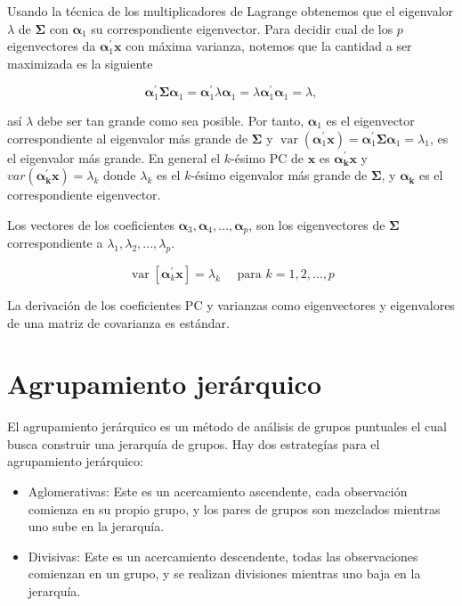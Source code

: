 Usando la técnica de los multiplicadores de Lagrange obtenemos que el eigenvalor $\lambda$ de $\boldsymbol{\Sigma}$ con $\boldsymbol{\alpha}_{1}$ su correspondiente eigenvector. Para decidir cual de los $p$ eigenvectores da $\boldsymbol{\alpha}_{1}^{\prime}\boldsymbol{x}$ con máxima varianza, notemos que la cantidad a ser maximizada es la siguiente

\[
\boldsymbol{\alpha}_{1}^{\prime} \boldsymbol{\Sigma} \boldsymbol{\alpha}_{1}=\boldsymbol{\alpha}_{1}^{\prime} \lambda \boldsymbol{\alpha}_{1}=\lambda \boldsymbol{\alpha}_{1}^{\prime} \boldsymbol{\alpha}_{1}=\lambda,
\]

así $\lambda$ debe ser tan grande como sea posible. Por tanto, $\boldsymbol{\alpha}_{1}$ es el eigenvector correspondiente al eigenvalor más grande de $\boldsymbol{\Sigma}$ y $\operatorname{var}\left(\boldsymbol{\alpha}_{1}^{\prime} \mathbf{x}\right)=\boldsymbol{\alpha}_{1}^{\prime} \boldsymbol{\Sigma} \boldsymbol{\alpha}_{1}=\lambda_{1}$, es el eigenvalor más grande.
En general el $k$-ésimo PC de $\boldsymbol{x}$ es $ \boldsymbol{\alpha_k^\prime} \boldsymbol{x}$ y $var(\boldsymbol{\alpha_k^\prime}\boldsymbol{x})=\lambda_k$ donde $\lambda_k$ es el $k$-ésimo eigenvalor más grande de $\boldsymbol{\Sigma}$, y $\boldsymbol{\alpha_k}$ es el correspondiente eigenvector.

Los vectores de los coeficientes $\boldsymbol{\alpha}_{3}, \boldsymbol{\alpha}_{4}, \ldots, \boldsymbol{\alpha}_{p}$, son los eigenvectores de $\boldsymbol{\Sigma}$ correspondiente a $\lambda_{1},\lambda_{2},...,\lambda_{p}$.

\[
\operatorname{var}\left[\boldsymbol{\alpha}_{k}^{\prime} \mathbf{x}\right]=\lambda_{k} \quad \text { para } k=1,2, \ldots, p
\]

La derivación de los coeficientes PC y varianzas como eigenvectores y eigenvalores de una matriz de covarianza es estándar. 

\section{Agrupamiento jerárquico}
El agrupamiento jerárquico es un método de análisis de grupos puntuales el cual busca construir una jerarquía de grupos.
Hay dos estrategías para el agrupamiento jerárquico:
\begin{itemize}
	\item Aglomerativas: Este es un acercamiento ascendente, cada observación comienza en su propio grupo, y los pares de grupos son mezclados mientras uno sube en la jerarquía.
	\item Divisivas: Este es un acercamiento descendente, todas las observaciones comienzan en un grupo, y se realizan divisiones mientras uno baja en la jerarquía.
\end{itemize}

